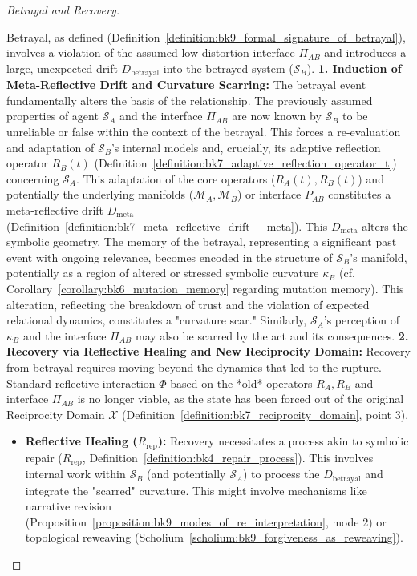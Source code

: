 \begin{proof}[Betrayal and Recovery]
\label{proof:bk9_betrayal_and_recovery}
\leavevmode

Betrayal, as defined (Definition~\ref{definition:bk9_formal_signature_of_betrayal}), involves a violation of the assumed low-distortion interface $\Pi_{AB}$ and introduces a large, unexpected drift $D_{\text{betrayal}}$ into the betrayed system ($\mathcal{S}_B$).
\textbf{1. Induction of Meta-Reflective Drift and Curvature Scarring:}
The betrayal event fundamentally alters the basis of the relationship. The previously assumed properties of agent $\mathcal{S}_A$ and the interface $\Pi_{AB}$ are now known by $\mathcal{S}_B$ to be unreliable or false within the context of the betrayal. This forces a re-evaluation and adaptation of $\mathcal{S}_B$'s internal models and, crucially, its adaptive reflection operator $R_B(t)$ (Definition~\ref{definition:bk7_adaptive_reflection_operator_t}) concerning $\mathcal{S}_A$. This adaptation of the core operators ($R_A(t), R_B(t)$) and potentially the underlying manifolds ($\mathcal{M}_A, \mathcal{M}_B$) or interface $P_{AB}$ constitutes a meta-reflective drift $D_{\text{meta}}$ (Definition~\ref{definition:bk7_meta_reflective_drift__meta}).
This $D_{\text{meta}}$ alters the symbolic geometry. The memory of the betrayal, representing a significant past event with ongoing relevance, becomes encoded in the structure of $\mathcal{S}_B$'s manifold, potentially as a region of altered or stressed symbolic curvature $\kappa_B$ (cf. Corollary~\ref{corollary:bk6_mutation_memory} regarding mutation memory). This alteration, reflecting the breakdown of trust and the violation of expected relational dynamics, constitutes a "curvature scar." Similarly, $\mathcal{S}_A$'s perception of $\kappa_B$ and the interface $\Pi_{AB}$ may also be scarred by the act and its consequences.
\textbf{2. Recovery via Reflective Healing and New Reciprocity Domain:}
Recovery from betrayal requires moving beyond the dynamics that led to the rupture. Standard reflective interaction $\Phi$ based on the *old* operators $R_A, R_B$ and interface $\Pi_{AB}$ is no longer viable, as the state has been forced out of the original Reciprocity Domain $\mathcal{X}$ (Definition~\ref{definition:bk7_reciprocity_domain}, point 3).
\begin{itemize}
    \item \textbf{Reflective Healing ($R_{\text{rep}}$):} Recovery necessitates a process akin to symbolic repair ($R_{\text{rep}}$, Definition~\ref{definition:bk4_repair_process}). This involves internal work within $\mathcal{S}_B$ (and potentially $\mathcal{S}_A$) to process the $D_{\text{betrayal}}$ and integrate the "scarred" curvature. This might involve mechanisms like narrative revision (Proposition~\ref{proposition:bk9_modes_of_re_interpretation}, mode 2) or topological reweaving (Scholium~\ref{scholium:bk9_forgiveness_as_reweaving}).

\end{itemize}
\end{proof}
